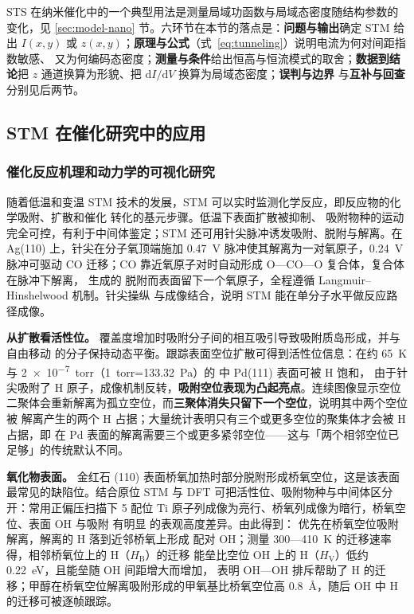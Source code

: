 STS 在纳米催化中的一个典型用法是测量局域功函数与局域态密度随结构参数的变化，见
\ref{sec:model-nano} 节。六环节在本节的落点是：\textbf{问题与输出}确定 STM 给出 $I(x,y)$
或 $z(x,y)$；\textbf{原理与公式}（式~\eqref{eq:tunneling}）说明电流为何对间距指数敏感、
又为何编码态密度；\textbf{测量与条件}给出恒高与恒流模式的取舍；\textbf{数据到结论}把
$z$ 通道换算为形貌、把 $\mathrm{d}I/\mathrm{d}V$ 换算为局域态密度；\textbf{误判与边界}
与\textbf{互补与回查}分别见后两节。

\subsection{STM 在催化研究中的应用}

\subsubsection{催化反应机理和动力学的可视化研究}

随着低温和变温 STM 技术的发展，STM 可以实时监测化学反应，即反应物的化学吸附、扩散和催化
转化的基元步骤。低温下表面扩散被抑制、
吸附物种的运动完全可控，有利于中间体鉴定；STM 还可用针尖脉冲诱发吸附、脱附与解离。在
Ag(110) 上，针尖在分子氧顶端施加 \qty{0.47}{V} 脉冲使其解离为一对氧原子，\qty{0.24}{V}
脉冲可驱动 CO 迁移；CO 靠近氧原子对时自动形成 O—CO—O 复合体，复合体在脉冲下解离，
生成的  脱附而表面留下一个氧原子，全程遵循 Langmuir--Hinshelwood 机制。针尖操纵
与成像结合，说明 STM 能在单分子水平做反应路径成像。

\textbf{从扩散看活性位。} 覆盖度增加时吸附分子间的相互吸引导致吸附质岛形成，并与自由移动
的分子保持动态平衡。跟踪表面空位扩散可得到活性位信息：在约 \qty{65}{K} 与
\qty{2e-7}{torr}（\qty{1}{torr}=\qty{133.32}{Pa}）的  中 Pd(111) 表面可被 H 饱和，
由于针尖吸附了 H 原子，成像机制反转，\textbf{吸附空位表现为凸起亮点}。连续图像显示空位
二聚体会重新解离为孤立空位，而\textbf{三聚体消失只留下一个空位}，说明其中两个空位被
 解离产生的两个 H 占据；大量统计表明只有三个或更多空位的聚集体才会被 H 占据，即
 在 Pd 表面的解离需要三个或更多紧邻空位——这与「两个相邻空位已足够」的传统默认不同。

\textbf{氧化物表面。} 金红石 (110) 表面桥氧加热时部分脱附形成桥氧空位，这是该表面
最常见的缺陷位。结合原位 STM 与 DFT 可把活性位、吸附物种与中间体区分开：常用正偏压扫描下
5 配位 Ti 原子列成像为亮行、桥氧列成像为暗行，桥氧空位、表面 OH 与吸附  有明显
的表观高度差异。由此得到： 优先在桥氧空位吸附解离，解离的 H 落到近邻桥氧上形成
配对 OH；测量 300—\qty{410}{K} 的迁移速率得，相邻桥氧位上的 H（$H_{\mathrm{B}}$）的迁移
能垒比空位 OH 上的 H（$H_{\mathrm{V}}$）低约 \qty{0.22}{eV}，且能垒随 OH 间距增大而增加，
表明 OH—OH 排斥帮助了 H 的迁移；甲醇在桥氧空位解离吸附形成的甲氧基比桥氧空位高
\qty{0.8}{\angstrom}，随后 OH 中 H 的迁移可被逐帧跟踪。

